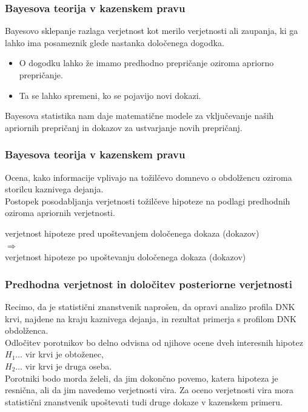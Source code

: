 \documentclass{beamer}
\begin{document}
\begin{frame}
    \frametitle{Bayesova teorija v kazenskem pravu}
    Bayesovo sklepanje razlaga verjetnost kot merilo verjetnosti ali zaupanja, ki ga lahko ima posameznik glede nastanka določenega dogodka.
    \begin{itemize}
      \item O dogodku lahko že imamo predhodno prepričanje oziroma apriorno prepričanje.
      \item Ta se lahko spremeni, ko se pojavijo novi dokazi.
    \end{itemize} \vspace{3mm}
    Bayesova statistika nam daje matematične modele za vključevanje naših apriornih prepričanj in dokazov za ustvarjanje novih prepričanj.
\end{frame}

\begin{frame}
    \frametitle{Bayesova teorija v kazenskem pravu}
    Ocena, kako informacije vplivajo na tožilčevo domnevo o obdolžencu oziroma storilcu kaznivega dejanja. \\ \vspace{3mm}
    Postopek posodabljanja verjetnosti tožilčeve hipoteze na podlagi predhodnih oziroma apriornih verjetnosti. \\ \vspace{3mm}
    \begin{block}{}
        \centering
        verjetnost hipoteze pred upoštevanjem določenega dokaza (dokazov) \\ \vspace{2mm}
        $\Rightarrow$ \\ \vspace{3mm}
        verjetnost hipoteze po upoštevanju določenega dokaza (dokazov)
    \end{block}
\end{frame}

\begin{frame}
    \frametitle{Predhodna verjetnost in določitev posteriorne verjetnosti}
    Recimo, da je statistični znanstvenik naprošen, da opravi analizo profila DNK krvi, najdene na kraju kaznivega dejanja, in rezultat primerja s profilom DNK 
    obdolženca.\\ \vspace{3mm}
    Odločitev porotnikov bo delno odvisna od njihove ocene dveh interesnih
    hipotez\\
    $H_1 \dots$ vir krvi je obtoženec,\\
    $H_2 \dots$ vir krvi je druga oseba.\\ \vspace{3mm}
    Porotniki bodo morda želeli, da jim dokončno povemo, katera hipoteza je resnična, ali da jim navedemo verjetnosti vira. Za oceno verjetnosti 
    vira mora statistični znanstvenik upoštevati tudi druge dokaze v kazenskem primeru.
\end{frame}
\end{document}
